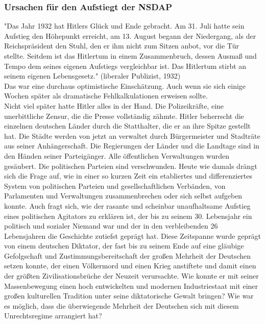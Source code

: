 \documentclass[letterpaper, 12pt]{article}
\let\tempsubsubsection\subsubsection
\renewcommand\subsubsection[1]{\vspace{0cm}\tempsubsubsection{#1}\vspace{0cm}}
\begin{document}
\subsubsection{Ursachen für den Aufstiegt der NSDAP}

"Das Jahr 1932 hat Hitlers Glück und Ende gebracht. Am 31. Juli hatte sein Aufstieg den Höhepunkt erreicht, am 13. August begann der Niedergang, als der Reichspräsident den Stuhl, den er ihm nicht zum Sitzen anbot, vor die Tür stellte. Seitdem ist das Hitlertum in einem Zusammenbruch, dessen Ausmaß und Tempo dem seines eigenen Aufstiegs vergleichbar ist. Das Hitlertum stirbt an seinem eigenen Lebensgesetz." (liberaler Publizist, 1932)\\
Das war eine durchaus optimistische Einschätzung. Auch wenn sie sich einige Wochen später als dramatische Fehlkalkulationen erweisen sollte. \\
Nicht viel später hatte Hitler alles in der Hand. Die Polizeikräfte, eine unerbittliche Zensur, die die Presse vollständig zähmte. Hitler beherrscht die einzelnen deutschen Länder durch die Statthalter, die er an ihre Spitze gestellt hat. Die Städte werden von jetzt an verwaltet durch Bürgermeister und Stadträte aus seiner Anhängerschaft. Die Regierungen der Länder und die Landtage sind in den Händen seiner Parteigänger. Alle öffentlichen Verwaltungen wurden gesäubert. Die politischen Parteien sind verschwunden. \clearpage
Heute wie damals drängt sich die Frage auf, wie in einer so kurzen Zeit ein etabliertes und differenziertes System von politischen Parteien und gesellschaftlichen Verbänden, von Parlamenten und Verwaltungen zusammenbrechen oder sich selbst aufgeben konnte. Auch fragt sich, wie der rasante und scheinbar unaufhaltsame Aufstieg eines politischen Agitators zu erklären ist, der bis zu seinem 30. Lebensjahr ein politisch und sozialer Niemand war und der in den verbleibenden 26 Lebensjahren die Geschichte zutiefst geprägt hat. Diese Zeitspanne wurde geprägt von einem deutschen Diktator, der fast bis zu seinem Ende auf eine gläubige Gefolgschaft und Zustimmungsbereitschaft der großen Mehrheit der Deutschen setzen konnte, der einen Völkermord und einen Krieg anstiftete und damit einen der größten Zivilisationsbrüche der Neuzeit verursachte. Wie konnte er mit seiner Massenbewegung einen hoch entwickelten und modernen Industriestaat mit einer großen kulturellen Tradition unter seine diktatorische Gewalt bringen? Wie war es möglich, dass die überwiegende Mehrheit der Deutschen sich mit diesem Unrechtsregime arrangiert hat? \\
\end{document}
